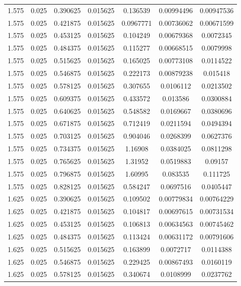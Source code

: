 \begin{table}[bh]
\begin{center}
{\begin{tabular}{ccccccc}
1.575	 & 0.025 & 	0.390625	 & 0.015625	 & 0.136539	 & 0.00994496	 & 0.00947536 \\ 
1.575	 & 0.025 & 	0.421875	 & 0.015625	 & 0.0967771	 & 0.00736062	 & 0.00671599 \\ 
1.575	 & 0.025 & 	0.453125	 & 0.015625	 & 0.104249	 & 0.00679368	 & 0.0072345 \\ 
1.575	 & 0.025 & 	0.484375	 & 0.015625	 & 0.115277	 & 0.00668515	 & 0.0079998 \\ 
1.575	 & 0.025 & 	0.515625	 & 0.015625	 & 0.165025	 & 0.00773108	 & 0.0114522 \\ 
1.575	 & 0.025 & 	0.546875	 & 0.015625	 & 0.222173	 & 0.00879238	 & 0.015418 \\ 
1.575	 & 0.025 & 	0.578125	 & 0.015625	 & 0.307655	 & 0.0106112	 & 0.0213502 \\ 
1.575	 & 0.025 & 	0.609375	 & 0.015625	 & 0.433572	 & 0.013586	 & 0.0300884 \\ 
1.575	 & 0.025 & 	0.640625	 & 0.015625	 & 0.548582	 & 0.0169667	 & 0.0380696 \\ 
1.575	 & 0.025 & 	0.671875	 & 0.015625	 & 0.712419	 & 0.0211594	 & 0.0494394 \\ 
1.575	 & 0.025 & 	0.703125	 & 0.015625	 & 0.904046	 & 0.0268399	 & 0.0627376 \\ 
1.575	 & 0.025 & 	0.734375	 & 0.015625	 & 1.16908	 & 0.0384025	 & 0.0811298 \\ 
1.575	 & 0.025 & 	0.765625	 & 0.015625	 & 1.31952	 & 0.0519883	 & 0.09157 \\ 
1.575	 & 0.025 & 	0.796875	 & 0.015625	 & 1.60995	 & 0.083535	 & 0.111725 \\ 
1.575	 & 0.025 & 	0.828125	 & 0.015625	 & 0.584247	 & 0.0697516	 & 0.0405447 \\ 
1.625	 & 0.025 & 	0.390625	 & 0.015625	 & 0.109502	 & 0.00779834	 & 0.00764229 \\ 
1.625	 & 0.025 & 	0.421875	 & 0.015625	 & 0.104817	 & 0.00697615	 & 0.00731534 \\ 
1.625	 & 0.025 & 	0.453125	 & 0.015625	 & 0.106813	 & 0.00634563	 & 0.00745462 \\ 
1.625	 & 0.025 & 	0.484375	 & 0.015625	 & 0.113424	 & 0.00631172	 & 0.00791606 \\ 
1.625	 & 0.025 & 	0.515625	 & 0.015625	 & 0.163899	 & 0.0072717	 & 0.0114388 \\ 
1.625	 & 0.025 & 	0.546875	 & 0.015625	 & 0.229425	 & 0.00867493	 & 0.0160119 \\ 
1.625	 & 0.025 & 	0.578125	 & 0.015625	 & 0.340674	 & 0.0108999	 & 0.0237762 \\ 

\end{tabular}}
\end{center}
\end{table}
